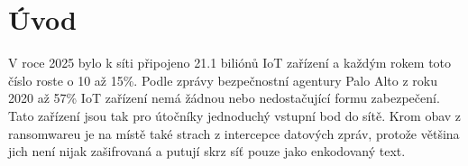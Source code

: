 \chapter*{Úvod} %
\setcounter{page}{1}

%
%


V roce 2025 bylo k síti připojeno 21.1 biliónů IoT zařízení \cite{connected_devices} a každým rokem toto číslo roste
o 10 až 15\%. Podle zprávy bezpečnostní agentury Palo Alto \cite{Unit2020} z roku 2020 až 57\% IoT zařízení nemá žádnou nebo nedostačující formu
zabezpečení. Tato zařízení jsou tak pro útočníky jednoduchý vstupní bod do sítě. Krom obav z ransomwareu je na místě také
strach z intercepce datových zpráv, protože většina jich není nijak zašifrovaná a putují skrz síť pouze jako enkodovaný text.

